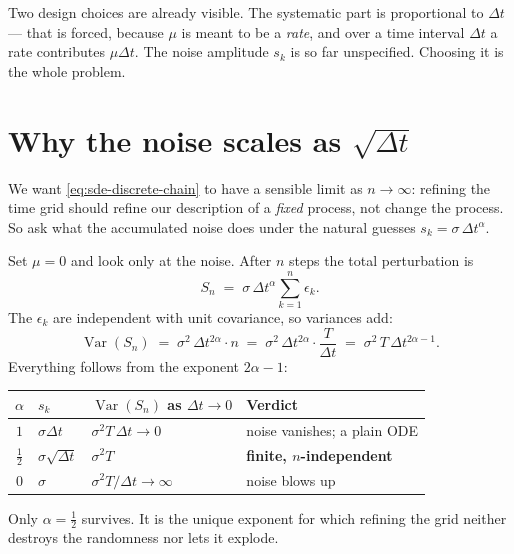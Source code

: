 \documentclass[11pt,a4paper]{report}
\theoremstyle{definition}
\theoremstyle{remark}
\DeclareMathOperator{\Var}{Var}
\begin{document}
Two design choices are already visible. The systematic part is proportional
to $\Delta t$ --- that is forced, because $\mu$ is meant to be a
\emph{rate}, and over a time interval $\Delta t$ a rate contributes
$\mu\Delta t$. The noise amplitude $s_k$ is so far unspecified. Choosing it
is the whole problem.

\section{Why the noise scales as \texorpdfstring{$\sqrt{\Delta t}$}{sqrt(dt)}}
\label{sec:sde-sqrt-scaling}

We want \eqref{eq:sde-discrete-chain} to have a sensible limit as
$n\to\infty$: refining the time grid should refine our description of a
\emph{fixed} process, not change the process. So ask what the accumulated
noise does under the natural guesses $s_k = \sigma\,\Delta t^{\alpha}$.

Set $\mu=0$ and look only at the noise. After $n$ steps the total
perturbation is
\begin{equation}
S_n \;=\; \sigma\,\Delta t^{\alpha}\sum_{k=1}^{n}\epsilon_k .
\end{equation}
The $\epsilon_k$ are independent with unit covariance, so variances add:
\begin{equation}
\label{eq:sde-variance-count}
\Var(S_n) \;=\; \sigma^2\,\Delta t^{2\alpha}\cdot n
\;=\; \sigma^2\,\Delta t^{2\alpha}\cdot\frac{T}{\Delta t}
\;=\; \sigma^2\,T\,\Delta t^{2\alpha-1}.
\end{equation}
Everything follows from the exponent $2\alpha-1$:

\begin{center}
\begin{tabular}{clll}
\toprule
$\alpha$ & $s_k$ & $\Var(S_n)$ as $\Delta t\to0$ & Verdict \\
\midrule
$1$ & $\sigma\Delta t$ & $\sigma^2T\,\Delta t\to0$ & noise vanishes; a plain ODE \\
$\tfrac12$ & $\sigma\sqrt{\Delta t}$ & $\sigma^2T$ & \textbf{finite, $n$-independent} \\
$0$ & $\sigma$ & $\sigma^2T/\Delta t\to\infty$ & noise blows up \\
\bottomrule
\end{tabular}
\end{center}

Only $\alpha=\tfrac12$ survives. It is the unique exponent for which
refining the grid neither destroys the randomness nor lets it explode.
\end{document}
